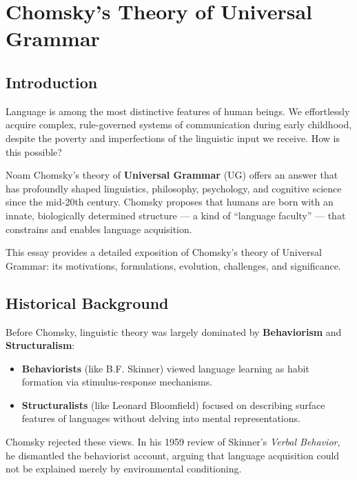 \documentclass[12pt]{article}
\newcommand{\tightlist}{\itemsep 0pt\parskip 0pt\parsep 0pt}
\begin{document}
\hypertarget{chomskys-theory-of-universal-grammar-1}{%
\section{Chomsky's Theory of Universal
Grammar}\label{chomskys-theory-of-universal-grammar-1}}

\hypertarget{introduction-3}{%
\subsection{Introduction}\label{introduction-3}}

Language is among the most distinctive features of human beings. We
effortlessly acquire complex, rule-governed systems of communication
during early childhood, despite the poverty and imperfections of the
linguistic input we receive. How is this possible?

Noam Chomsky's theory of \textbf{Universal Grammar} (UG) offers an
answer that has profoundly shaped linguistics, philosophy, psychology,
and cognitive science since the mid-20th century. Chomsky proposes that
humans are born with an innate, biologically determined structure --- a
kind of ``language faculty'' --- that constrains and enables language
acquisition.

This essay provides a detailed exposition of Chomsky's theory of
Universal Grammar: its motivations, formulations, evolution, challenges,
and significance.

\hypertarget{historical-background-2}{%
\subsection{Historical Background}\label{historical-background-2}}

Before Chomsky, linguistic theory was largely dominated by
\textbf{Behaviorism} and \textbf{Structuralism}:

\begin{itemize}
\tightlist
\item
  \textbf{Behaviorists} (like B.F. Skinner) viewed language learning as
  habit formation via stimulus-response mechanisms.
\item
  \textbf{Structuralists} (like Leonard Bloomfield) focused on
  describing surface features of languages without delving into mental
  representations.
\end{itemize}

Chomsky rejected these views. In his 1959 review of Skinner's
\emph{Verbal Behavior}, he dismantled the behaviorist account, arguing
that language acquisition could not be explained merely by environmental
conditioning.
\end{document}
